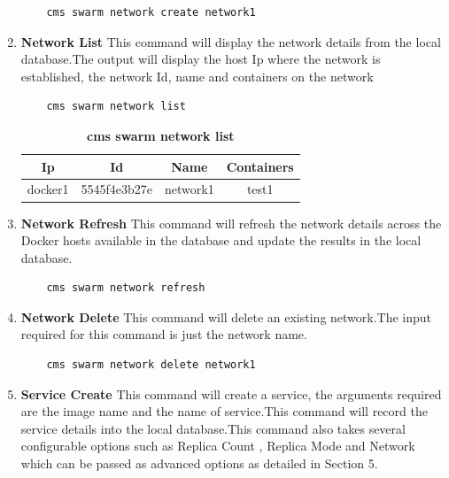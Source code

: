 \documentclass[9pt,twocolumn,twoside]{../../styles/osajnl}
\begin{document}
\begin{enumerate}
    \begin{verbatim}
    cms swarm network create network1 
    \end{verbatim}
    
    \item \textbf{Network List}
     This command will display the network details from the local database.The output will display the host Ip where the network is established, the network Id, name and containers on the network\\
     
    \begin{verbatim}
    cms swarm network list  
    \end{verbatim}
    
    \begin{table}[htbp]
     \caption{\bf cms swarm network list }
     \begin{tabular}{cccc}
     \hline
      Ip & Id & Name & Containers\\
      \hline
      docker1 & 5545f4e3b27e & network1 & test1  \\
     \hline
     \end{tabular}
     \label{tab:tab6}
     \end{table}
     
    \item \textbf{Network Refresh}
    This command will refresh the network details across the Docker hosts available in the database and update the results in the local database.\\
    
    \begin{verbatim}
    cms swarm network refresh  
    \end{verbatim}
    
    
    \item \textbf{Network Delete}
    This command will delete an existing network.The input required for this command is just the network name.
    
    \begin{verbatim}
    cms swarm network delete network1  
    \end{verbatim}
    
    
    \item \textbf{Service Create}
    This command will create a service, the arguments required are the image name and the name of service.This command will record the service details into the local database.This command also takes several configurable options such as Replica Count , Replica Mode and Network which can be passed as advanced options as detailed in Section 5.\\
    

\end{enumerate}
\end{document}
